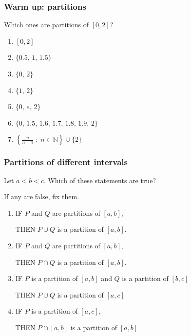 \documentclass[14pt]{beamer}
\begin{document}
\begin{frame}[t]
	\frametitle{Warm up: partitions}

	Which ones are partitions of $[0,2]$?

	\begin{enumerate}
		\item $\displaystyle [0,2]$

		\item $\displaystyle \{0.5, \,1, \,1.5\}$

		\item $\displaystyle \{0,\,2\}$

		\item $\displaystyle \{1,\,2\}$

		\item $\displaystyle \{0, \,e, \,2 \}$

		\item $\displaystyle \{0, \,1.5, \,1.6, \,1.7, \,1.8, \,1.9, \,2\}$

		\item $\displaystyle \left\{ \frac{n}{n+1}\; : \; n \in \mathbb{N}\right\} \cup
			\{ 2 \}$
	\end{enumerate}
\end{frame}

\begin{frame}[t]
	\fontsize{13}{13}\selectfont
	\frametitle{Partitions of different intervals}

	Let $a<b<c$. Which of these statements are true?

	If any are false, fix them.
	\vspace{.1cm}
	\begin{enumerate}
		\item IF $P$ and $Q$ are partitions of $[a,b]$,
			\vspace{.1cm}

			THEN $P \cup Q$ is a partition of $[a,b]$.
			\vspace{.1cm}

		\item IF $P$ and $Q$ are partitions of $[a,b]$,
			\vspace{.1cm}

			THEN $P \cap Q$ is a partition of $[a,b]$.
			\vspace{.1cm}

		\item IF $P$ is a partition of $[a,b]$ and $Q$ is a partition of $[b,c]$
			\vspace{.1cm}

			THEN $P \cup Q$ is a partition of $[a,c]$
			\vspace{.1cm}

		\item IF $P$ is a partition of $[a,c]$,
			\vspace{.1cm}

			THEN $P \cap [a,b]$ is a partition of $[a,b]$
	\end{enumerate}
\end{frame}
\end{document}
